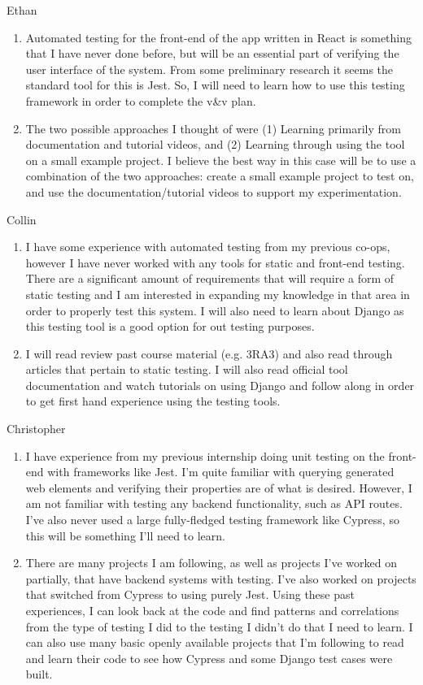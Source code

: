 \documentclass[12pt, titlepage]{article}
\begin{document}
Ethan
\begin{enumerate}
    \item Automated testing for the front-end of the app written in React is something that I have never done before, but will be an essential part of verifying the user interface of the system. From some preliminary research it seems the standard tool for this is Jest. So, I will need to learn how to use this testing framework in order to complete the v\&v plan.
    \item The two possible approaches I thought of were (1) Learning primarily from documentation and tutorial videos, and (2) Learning through using the tool on a small example project. I believe the best way in this case will be to use a combination of the two approaches: create a small example project to test on, and use the documentation/tutorial videos to support my experimentation.
\end{enumerate}

Collin
\begin{enumerate}
    \item I have some experience with automated testing from my previous co-ops, however I have never worked with any tools for static and front-end testing. There are a significant amount of requirements that will require a form of static testing and I am interested in expanding my knowledge in that area in order to properly test this system. I will also need to learn about Django as this testing tool is a good option for out testing purposes.
    \item I will read review past course material (e.g. 3RA3) and also read through articles that pertain to static testing. I will also read official tool documentation and watch tutorials on using Django and follow along in order to get first hand experience using the testing tools.
\end{enumerate}

Christopher
\begin{enumerate}
    \item I have experience from my previous internship doing unit testing on the front-end with frameworks like Jest. I'm quite familiar with querying generated web elements and verifying their properties are of what is desired. However, I am not familiar with testing any backend functionality, such as API routes. I've also never used a large fully-fledged testing framework like Cypress, so this will be something I'll need to learn.
    \item There are many projects I am following, as well as projects I've worked on partially, that have backend systems with testing. I've also worked on projects that switched from Cypress to using purely Jest. Using these past experiences, I can look back at the code and find patterns and correlations from the type of testing I did to the testing I didn't do that I need to learn. I can also use many basic openly available projects that I'm following to read and learn their code to see how Cypress and some Django test cases were built.
\end{enumerate}
\end{document}
